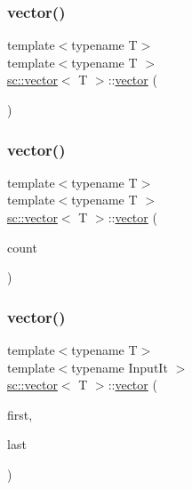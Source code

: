 \subsubsection{\texorpdfstring{vector()}{vector()}\hspace{0.1cm}{\footnotesize\ttfamily [7/11]}}
{\footnotesize\ttfamily template$<$typename T$>$ \\
template$<$typename T $>$ \\
\mbox{\hyperlink{classsc_1_1vector}{sc\+::vector}}$<$ T $>$\+::\mbox{\hyperlink{classsc_1_1vector}{vector}} (\begin{DoxyParamCaption}\item[{void}]{ }\end{DoxyParamCaption})}

\mbox{\label{classsc_1_1vector_a09edcd127164af330873721038aa4ccc}} 
\subsubsection{\texorpdfstring{vector()}{vector()}\hspace{0.1cm}{\footnotesize\ttfamily [8/11]}}
{\footnotesize\ttfamily template$<$typename T$>$ \\
template$<$typename T $>$ \\
\mbox{\hyperlink{classsc_1_1vector}{sc\+::vector}}$<$ T $>$\+::\mbox{\hyperlink{classsc_1_1vector}{vector}} (\begin{DoxyParamCaption}\item[{typename \mbox{\hyperlink{classsc_1_1vector}{vector}}$<$ T $>$\+::size\+\_\+type}]{count }\end{DoxyParamCaption})}

\mbox{\label{classsc_1_1vector_ab58c55200c6a120b9d24793a271512fb}} 
\subsubsection{\texorpdfstring{vector()}{vector()}\hspace{0.1cm}{\footnotesize\ttfamily [9/11]}}
{\footnotesize\ttfamily template$<$typename T$>$ \\
template$<$typename Input\+It $>$ \\
\mbox{\hyperlink{classsc_1_1vector}{sc\+::vector}}$<$ T $>$\+::\mbox{\hyperlink{classsc_1_1vector}{vector}} (\begin{DoxyParamCaption}\item[{Input\+It}]{first,  }\item[{Input\+It}]{last }\end{DoxyParamCaption})}

